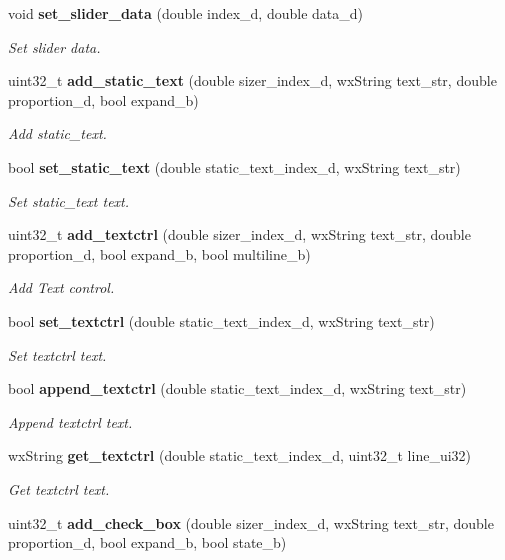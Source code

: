 \begin{DoxyCompactItemize}
void \textbf{ set\+\_\+slider\+\_\+data} (double index\+\_\+d, double data\+\_\+d)
\begin{DoxyCompactList}\small\item\em Set slider data. \end{DoxyCompactList}\item 
uint32\+\_\+t \textbf{ add\+\_\+static\+\_\+text} (double sizer\+\_\+index\+\_\+d, wx\+String text\+\_\+str, double proportion\+\_\+d, bool expand\+\_\+b)
\begin{DoxyCompactList}\small\item\em Add static\+\_\+text. \end{DoxyCompactList}\item 
bool \textbf{ set\+\_\+static\+\_\+text} (double static\+\_\+text\+\_\+index\+\_\+d, wx\+String text\+\_\+str)
\begin{DoxyCompactList}\small\item\em Set static\+\_\+text text. \end{DoxyCompactList}\item 
uint32\+\_\+t \textbf{ add\+\_\+textctrl} (double sizer\+\_\+index\+\_\+d, wx\+String text\+\_\+str, double proportion\+\_\+d, bool expand\+\_\+b, bool multiline\+\_\+b)
\begin{DoxyCompactList}\small\item\em Add Text control. \end{DoxyCompactList}\item 
bool \textbf{ set\+\_\+textctrl} (double static\+\_\+text\+\_\+index\+\_\+d, wx\+String text\+\_\+str)
\begin{DoxyCompactList}\small\item\em Set textctrl text. \end{DoxyCompactList}\item 
bool \textbf{ append\+\_\+textctrl} (double static\+\_\+text\+\_\+index\+\_\+d, wx\+String text\+\_\+str)
\begin{DoxyCompactList}\small\item\em Append textctrl text. \end{DoxyCompactList}\item 
wx\+String \textbf{ get\+\_\+textctrl} (double static\+\_\+text\+\_\+index\+\_\+d, uint32\+\_\+t line\+\_\+ui32)
\begin{DoxyCompactList}\small\item\em Get textctrl text. \end{DoxyCompactList}\item 
uint32\+\_\+t \textbf{ add\+\_\+check\+\_\+box} (double sizer\+\_\+index\+\_\+d, wx\+String text\+\_\+str, double proportion\+\_\+d, bool expand\+\_\+b, bool state\+\_\+b)

\end{DoxyCompactItemize}
